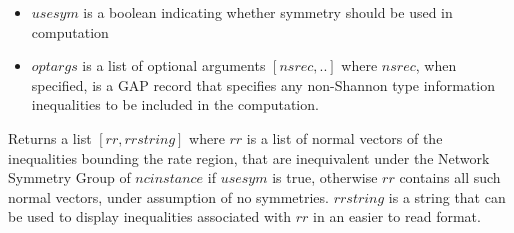 \documentclass[a4paper,11pt]{report}
\begin{document}
{{{\begin{itemize}
\item  $usesym$ is a boolean indicating whether symmetry should be used in computation 
\item  $optargs$ is a list of optional arguments $[nsrec,..]$ where $nsrec$, when specified, is a GAP record that specifies any non-Shannon type
information inequalities to be included in the computation. 
\end{itemize}
 Returns a list $[rr,rrstring]$ where $rr$ is a list of normal vectors of the inequalities bounding the rate region, that
are inequivalent under the Network Symmetry Group of $ncinstance$ if $usesym$ is true, otherwise $rr$ contains all such normal vectors, under assumption of no symmetries. $rrstring$ is a string that can be used to display inequalities associated with $rr$ in an easier to read format. }

}}
\end{document}
